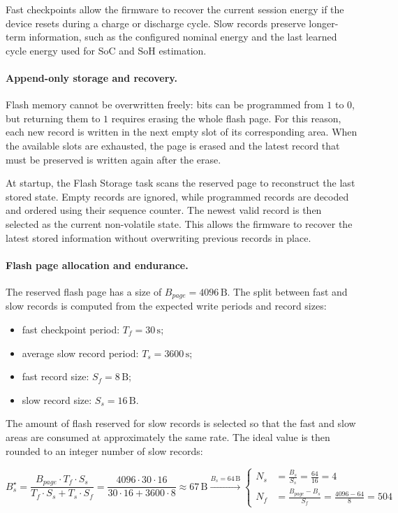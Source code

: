Fast checkpoints allow the firmware to recover the current session energy if the device resets during a charge or discharge cycle. Slow records preserve longer-term information, such as the configured nominal energy and the last learned cycle energy used for SoC and SoH estimation.

\paragraph{Append-only storage and recovery.}
Flash memory cannot be overwritten freely: bits can be programmed from \(1\) to \(0\), but returning them to \(1\) requires erasing the whole flash page. For this reason, each new record is written in the next empty slot of its corresponding area. When the available slots are exhausted, the page is erased and the latest record that must be preserved is written again after the erase.

At startup, the Flash Storage task scans the reserved page to reconstruct the last stored state. Empty records are ignored, while programmed records are decoded and ordered using their sequence counter. The newest valid record is then selected as the current non-volatile state. This allows the firmware to recover the latest stored information without overwriting previous records in place.

\paragraph{Flash page allocation and endurance.}
The reserved flash page has a size of \(B_{page} = 4096\,\mathrm{B}\). The split between fast and slow records is computed from the expected write periods and record sizes:

\begin{itemize}
	\item fast checkpoint period: \(T_f = 30\,\mathrm{s}\);
	\item average slow record period: \(T_s = 3600\,\mathrm{s}\);
	\item fast record size: \(S_f = 8\,\mathrm{B}\);
	\item slow record size: \(S_s = 16\,\mathrm{B}\).
\end{itemize}

The amount of flash reserved for slow records is selected so that the fast and slow areas are consumed at approximately the same rate. The ideal value is then rounded to an integer number of slow records:

\[
B_s^\star =
\frac{B_{page} \cdot T_f \cdot S_s}
{T_f \cdot S_s + T_s \cdot S_f}
=
\frac{4096 \cdot 30 \cdot 16}
{30 \cdot 16 + 3600 \cdot 8}
\approx
67\,\mathrm{B}
\xrightarrow{B_s = 64\,\mathrm{B}}
\left\{
\begin{aligned}
	N_s &= \frac{B_s}{S_s} = \frac{64}{16} = 4 \\
	N_f &= \frac{B_{page} - B_s}{S_f} = \frac{4096 - 64}{8} = 504
\end{aligned}
\right.
\]

